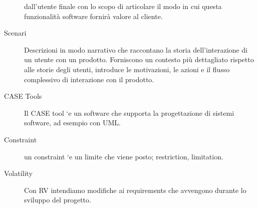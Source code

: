 \documentclass{article}
\begin{document}
\begin{description}
		dall'utente finale con lo scopo di articolare il modo in cui questa
		funzionalità software fornirà valore al cliente.
		\item[Scenari] Descrizioni in modo narrativo che raccontano la storia dell'interazione di
		un utente con un prodotto. Forniscono un contesto più dettagliato rispetto
		alle storie degli utenti, introduce le motivazioni, le azioni e il flusso
		complessivo di interazione con il prodotto.
		\item[CASE Tools] Il CASE tool `e un software che supporta la progettazione di sistemi software, ad esempio con UML.
		\item[Constraint] un constraint `e un limite che viene posto; restriction, limitation.
		\item[Volatility] Con RV intendiamo modifiche ai requirements che avvengono durante lo sviluppo del progetto.
	\end{description}
	
\end{document}
